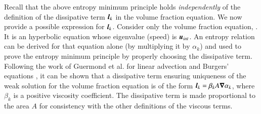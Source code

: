 \documentclass[preprint,10pt]{elsarticle}
\begin{document}
Recall that the above entropy minimum principle holds {\it independently} of the definition of the dissipative term $\boldsymbol l_k$
in the volume fraction equation. We now provide a possible expression for $\boldsymbol l_k$.
%
Consider only the volume fraction equation, . It is an hyperbolic equation
whose eigenvalue (speed) is $\boldsymbol u_{int}$. An entropy relation can be derived for that equation alone (by multiplying it by $\alpha_k$)
and used to prove the entropy minimum principle by properly choosing the dissipative term.
Following
the work of Guermond et al. for linear advection and Burgers' equations \cite{jlg1, jlg2}, it can be shown that a dissipative term ensuring 
uniqueness of the weak solution for the volume fraction equation is of the form $\boldsymbol l_k = \beta_k A \boldsymbol\nabla \alpha_k $, where $\beta_k$
is a positive viscosity coefficient. The dissipative term is made proportional to the area $A$ for consistency with 
the other definitions of the viscous terms.
\end{document}
